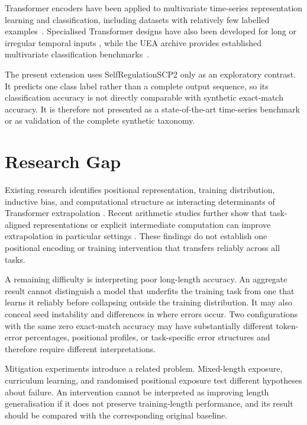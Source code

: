 \documentclass[
    author={Aanchala Ravindra Bhongade},
    supervisor={Dr. Fernando Moreno-Pino},
    degree={MSc},
    title={Length Generalisation in Transformer-Based Sequence Models: Failure Taxonomy and Mitigation Strategies},
    subtitle={},
    type={},
    year={2026}
]{dissertation}
\begin{document}
Transformer encoders have been applied to multivariate time-series
representation learning and classification, including datasets with relatively few labelled examples~\cite{zerveas2021timeseries}. Specialised Transformer designs have also been developed for long or irregular temporal inputs \cite{morenopino2024rough}, while the UEA archive provides established multivariate classification benchmarks~\cite{bagnall2018uea}.

The present extension uses SelfRegulationSCP2 only as an exploratory contrast. It predicts one class label rather than a complete output sequence, so its classification accuracy is not directly comparable with synthetic exact-match accuracy. It is therefore not presented as a state-of-the-art time-series benchmark or as validation of the complete synthetic taxonomy.

\section{Research Gap}

Existing research identifies positional representation, training
distribution, inductive bias, and computational structure as interacting determinants of Transformer extrapolation \cite{press2022train,kazemnejad2023impact,ruoss2023randomized,
ontanon2022compositional,weiss2021thinking}. Recent arithmetic studies further show that task-aligned representations or explicit intermediate computation can improve extrapolation in particular settings \cite{anil2022exploring,lee2024teaching,mcleish2024arithmetic,
hou2025turing}. These findings do not establish one positional encoding or training intervention that transfers reliably across all tasks.

A remaining difficulty is interpreting poor long-length accuracy. An
aggregate result cannot distinguish a model that underfits the training task from one that learns it reliably before collapsing outside the training distribution. It may also conceal seed instability and differences in where errors occur. Two configurations with the same zero exact-match accuracy may have substantially different token-error percentages, positional profiles, or task-specific error structures and therefore require different interpretations.

Mitigation experiments introduce a related problem. Mixed-length exposure, curriculum learning, and randomised positional exposure test different hypotheses about failure. An intervention cannot be interpreted as improving length generalisation if it does not preserve training-length performance, and its result should be compared with the corresponding original baseline.
\end{document}
